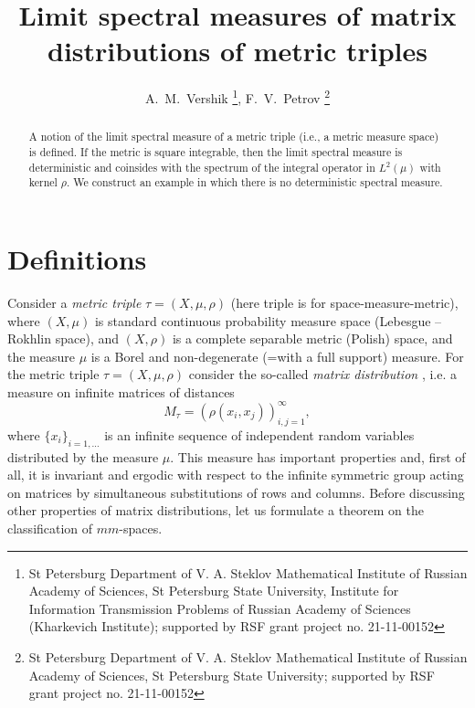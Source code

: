 \documentclass[11pt]{article}
\begin{document}
\title{Limit spectral measures of matrix distributions of metric triples
}


\author{{A.~M.~Vershik \thanks{St Petersburg Department
of V. A. Steklov Mathematical Institute of Russian Academy
of Sciences, St Petersburg State University, Institute for Information
Transmission Problems of Russian Academy of Sciences (Kharkevich Institute); supported by RSF grant project no. 21-11-00152}},
 {F.~V.~Petrov \thanks{St Petersburg Department
of V. A. Steklov Mathematical Institute of Russian Academy
of Sciences, St Petersburg State University; supported by RSF grant project no. 21-11-00152}}}


\maketitle

\begin{abstract}
A notion of the limit spectral measure of a metric triple (i.e., a metric measure space) is defined.
If the metric is square integrable, then the limit spectral measure
is deterministic and coinsides with the spectrum of the integral
operator in $L^2(\mu)$ with kernel $\rho$. We construct an example
in which there is no deterministic spectral measure.
\end{abstract}


\section{Definitions}




Consider a \emph{metric triple} $\tau=(X,\mu,\rho)$ (here triple is for space-measure-metric), 
where $(X,\mu)$ is standard continuous probability measure  space 
(Lebesgue -- Rokhlin space), and $(X,\rho)$ is a
complete separable metric (Polish) space, and the
measure $\mu$ is a Borel and non-degenerate (=with a full support) measure.
For the metric triple $\tau=(X,\mu,\rho)$
consider the so-called \emph{matrix distribution} \cite{Ve}, i.e. a measure on infinite matrices
of distances $$M_{\tau}=(\rho(x_i,x_j))_{i,j=1}^\infty,$$
where $\{x_i\}_{i=1,\dots}$ is an infinite sequence of independent random variables distributed 
by the measure $\mu$.
This measure has important properties and, 
first of all, it is invariant and ergodic with respect to the infinite symmetric group acting on matrices by simultaneous substitutions of rows and columns.
Before discussing other properties of matrix distributions, let us formulate a theorem on the classification of $mm$-spaces.
\end{document}
